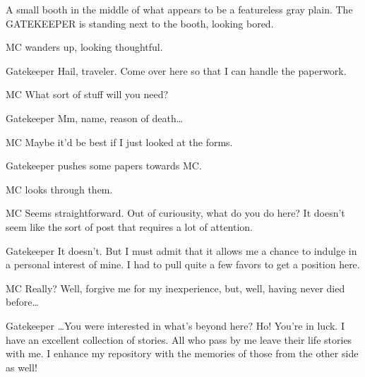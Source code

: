 

A small booth in the middle of what appears to be a featureless gray plain.
The GATEKEEPER is standing next to the booth, looking bored.

MC wanders up, looking thoughtful.

\begin{dialogue}{Gatekeeper}
Hail, traveler.
Come over here so that I can handle the paperwork.
\end{dialogue}

\begin{dialogue}{MC}
What sort of stuff will you need?
\end{dialogue}

\begin{dialogue}{Gatekeeper}
Mm, name, reason of death\ldots
\end{dialogue}

\begin{dialogue}[hurridly]{MC}
Maybe it'd be best if I just looked at the forms.
\end{dialogue}

Gatekeeper pushes some papers towards MC.

MC looks through them.

\begin{dialogue}{MC}
Seems straightforward.
Out of curiousity, what do you do here?
It doesn't seem like the sort of post that requires a lot of attention.
\end{dialogue}

\begin{dialogue}{Gatekeeper}
It doesn't.
But I must admit that it allows me a chance to indulge in a personal interest of mine.
I had to pull quite a few favors to get a position here.
\end{dialogue}

\begin{dialogue}{MC}
Really?
Well, forgive me for my inexperience, but, well, having never died before\ldots
\end{dialogue}

\begin{dialogue}{Gatekeeper}
\ldots You were interested in what's beyond here?
Ho! You're in luck.
I have an excellent collection of stories.
All who pass by me leave their life stories with me.
I enhance my repository with the memories of those from the other side as well!
\end{dialogue}

